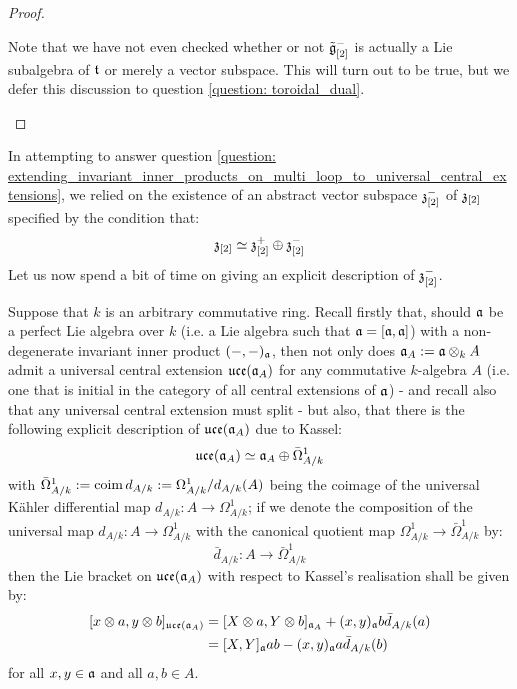 \begin{proof}
\begin{enumerate}
                        Note that we have not even checked whether or not $\tilde{\mathfrak{g}}_{[2]}^-$ is actually a Lie subalgebra of $\mathfrak{t}$ or merely a vector subspace. This will turn out to be true, but we defer this discussion to question \ref{question: toroidal_dual}. 
                    \end{enumerate}
                \end{proof}
            \begin{remark} \label{remark: centres_of_dual_toroidal_lie_bialgebras}
                In attempting to answer question \ref{question: extending_invariant_inner_products_on_multi_loop_to_universal_central_extensions}, we relied on the existence of an abstract vector subspace $\mathfrak{z}_{[2]}^-$ of $\mathfrak{z}_{[2]}$ specified by the condition that:
                    $$\mathfrak{z}_{[2]} \simeq \mathfrak{z}_{[2]}^+ \oplus \mathfrak{z}_{[2]}^-$$
                Let us now spend a bit of time on giving an explicit description of $\mathfrak{z}_{[2]}^-$. 

                Suppose that $k$ is an arbitrary commutative ring. Recall firstly that, should $\mathfrak{a}$ be a perfect Lie algebra over $k$ (i.e. a Lie algebra such that $\mathfrak{a} = [\mathfrak{a}, \mathfrak{a}]$) with a non-degenerate invariant inner product $(-, -)_{\mathfrak{a}}$, then not only does $\a_A := \a \tensor_k A$ admit a universal central extension $\mathfrak{uce}(\mathfrak{a}_A)$ for any commutative $k$-algebra $A$ (i.e. one that is initial in the category of all central extensions of $\mathfrak{a}$) - and recall also that any universal central extension must split - but also, that there is the following explicit description of $\mathfrak{uce}(\mathfrak{a}_A)$ due to Kassel:
                    $$\mathfrak{uce}(\mathfrak{a}_A) \simeq \mathfrak{a}_A \oplus \bar{\Omega}^1_{A/k}$$
                with $\bar{\Omega}^1_{A/k} := \operatorname{coim} d_{A/k} := \Omega^1_{A/k}/d_{A/k}(A)$ being the coimage of the universal K\"ahler differential map $d_{A/k}: A \to \Omega^1_{A/k}$; if we denote the composition of the universal map $d_{A/k}: A \to \Omega^1_{A/k}$ with the canonical quotient map $\Omega^1_{A/k} \to \bar{\Omega}^1_{A/k}$ by:
                    $$\bar{d}_{A/k}: A \to \bar{\Omega}^1_{A/k}$$
                then the Lie bracket on $\mathfrak{uce}(\mathfrak{a}_A)$ with respect to Kassel's realisation shall be given by:
                    $$
                        \begin{aligned}
                            [ x \tensor a, y \tensor b ]_{\uce(\a_A)} & = [ X \tensor a, Y \tensor b ]_{\a_A} + (x, y)_{\a} b \bar{d}_{A/k}(a)
                            \\
                            & = [X, Y]_{\a} ab - (x, y)_{\a} a \bar{d}_{A/k}(b)
                        \end{aligned}
                    $$
                for all $x, y \in \mathfrak{a}$ and all $a, b \in A$.
                    

\end{remark}
